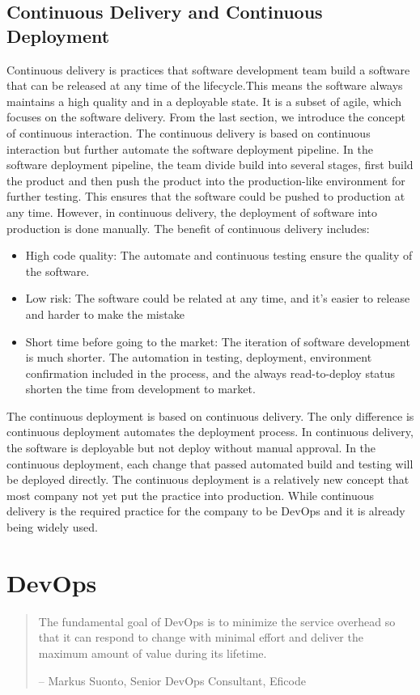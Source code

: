 \subsection{Continuous Delivery and Continuous Deployment}
\label{CD}
Continuous delivery is practices that software development team build a software that can be released at any time of the lifecycle.\cite{fowler2013continuous}This means the software always maintains a high quality and in a deployable state.\cite{WhatisCo47:online} It is a subset of agile, which focuses on the software delivery.\cite{Continuo97:online} From the last section, we introduce the concept of continuous interaction. The continuous delivery is based on continuous interaction but further automate the software deployment pipeline. In the software deployment pipeline, the team divide build into several stages, first build the product and then push the product into the production-like environment for further testing. This ensures that the software could be pushed to production at any time. However, in continuous delivery, the deployment of software into production is done manually.
The benefit of continuous delivery includes:\cite{WhatisCo47:online}\cite{fowler2013continuous}
\begin{itemize}
    \item High code quality: The automate and continuous testing ensure the quality of the software.
    \item Low risk: The software could be related at any time, and it's easier to release and harder to make the mistake
    \item Short time before going to the market: The iteration of software development is much shorter. The automation in testing, deployment, environment confirmation included in the process, and the always read-to-deploy status shorten the time from development to market.
\end{itemize}
The continuous deployment is based on continuous delivery. The only difference is continuous deployment automates the deployment process. In continuous delivery, the software is deployable but not deploy without manual approval. In the continuous deployment, each change that passed automated build and testing will be deployed directly. The continuous deployment is a relatively new concept that most company not yet put the practice into production.\cite{leppanen2015highways} While continuous delivery is the required practice for the company to be DevOps and it is already being widely used.
\section{DevOps}
\begin{quotation}
    The fundamental goal of DevOps is to minimize the service overhead so that it can respond to change with minimal effort and deliver the maximum amount of value during its lifetime.
    \begin{flushright}
        -- Markus Suonto, Senior DevOps Consultant, Eficode
    \end{flushright}
\end{quotation}
